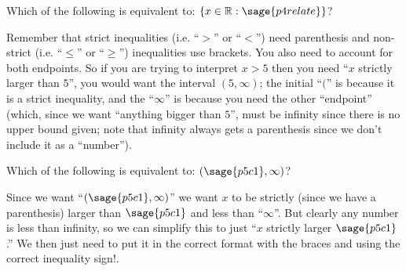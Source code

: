 \documentclass{ximera}
\begin{document}
\begin{problem}
    Which of the following is equivalent to: $\{ x \in \mathbb{R} : \sage{p4relate} \}$?
    \begin{multipleChoice}
    \end{multipleChoice}
    
    \begin{feedback}
        Remember that strict inequalities (i.e. ``$>$'' or ``$<$'') need parenthesis and non-strict (i.e. ``$\leq$'' or ``$\geq$'') inequalities use brackets. You also need to account for both endpoints. So if you are trying to interpret $x > 5$ then you need ``$x$ strictly larger than $5$'', you would want the interval $(5,\infty)$; the initial ``$($'' is because it is a strict inequality, and the ``$\infty$'' is because you need the other ``endpoint'' (which, since we want ``anything bigger than $5$'', must be infinity since there is no upper bound given; note that infinity always gets a parenthesis since we don't include it as a ``number'').
    \end{feedback}
\end{problem}


\begin{problem}
    Which of the following is equivalent to: $(\sage{p5c1}, \infty)$?
    \begin{multipleChoice}
    \end{multipleChoice}
    
    
    \begin{feedback}
        Since we want ``$(\sage{p5c1}, \infty)$'' we want $x$ to be strictly (since we have a parenthesis) larger than $\sage{p5c1}$ and less than ``$\infty$''. But clearly any number is less than infinity, so we can simplify this to just ``$x$ strictly larger $\sage{p5c1}$.'' We then just need to put it in the correct format with the braces and using the correct inequality sign!. 
    \end{feedback}
\end{problem}
\end{document}
